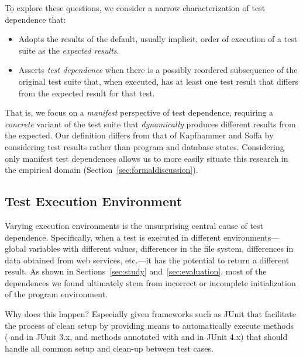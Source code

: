 To explore these questions, we consider a narrow characterization
of test dependence that:
\begin{itemize}
\item Adopts the results of the default, usually implicit,
  order of execution of a test suite as the \emph{expected results}. 
\item Asserts \emph{test dependence\/} when there is a possibly
  reordered subsequence of the original test suite that, when
  executed, has at least one test result that differs from the
  expected result for that test.  
\end{itemize}
That is, we focus on a \emph{manifest\/} perspective of test dependence,
requiring a \emph{concrete\/} variant of the test suite that
\emph{dynamically\/} produces different results from the expected.  Our
definition differs from that of Kapfhammer and Soffa by considering
test results rather than program and database states.
Considering only manifest test dependences allows
us to more easily situate this research in the empirical domain (Section~\ref{sec:formaldiscussion}).



\subsection{Test Execution Environment}

Varying execution environments is the unsurprising central
cause of test dependence. Specifically, when a
test is executed in different environments---global variables
with different values, differences in the file system, differences in
data obtained from web services, etc.---it has the potential to return
a different result.  
As shown in Sections~\ref{sec:study} and~\ref{sec:evaluation}, most of the dependences we found
ultimately stem from incorrect or incomplete initialization
of the program environment.

Why does this happen? Especially given frameworks such as
JUnit that facilitate the process of clean setup by providing means to
automatically execute methods ( and  in JUnit
3.x, and methods annotated with  and  in
JUnit 4.x) that should handle all common setup and clean-up between
test cases. 

